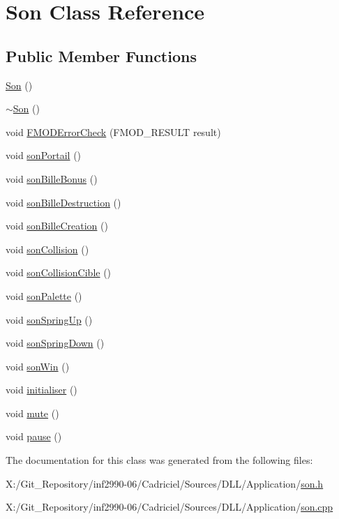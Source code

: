 \hypertarget{class_son}{\section{Son Class Reference}
\label{class_son}
}
\subsection*{Public Member Functions}
\begin{DoxyCompactItemize}
\item 
\hyperlink{group__inf2990_ga20959ed8377de4ceaaa835fb5092cc73}{Son} ()
\item 
\hyperlink{group__inf2990_gab5bc2f6252e48b6ace6948cb730c6e3e}{$\sim$\-Son} ()
\item 
void \hyperlink{group__inf2990_ga9f42aa8fe9666fdb9845d69a32652265}{F\-M\-O\-D\-Error\-Check} (F\-M\-O\-D\-\_\-\-R\-E\-S\-U\-L\-T result)
\item 
void \hyperlink{group__inf2990_gaa31e5f371d2cec4cd3e2c0411aa59d79}{son\-Portail} ()
\item 
void \hyperlink{group__inf2990_gad0ac66ec1e71ffbb7186add122bea57a}{son\-Bille\-Bonus} ()
\item 
void \hyperlink{group__inf2990_ga97e186097aa2bd7cdbac51aa1d89ab1f}{son\-Bille\-Destruction} ()
\item 
void \hyperlink{group__inf2990_gab09a0d564829d69afa9977ef99f6e535}{son\-Bille\-Creation} ()
\item 
void \hyperlink{group__inf2990_gabe3e586fa674225f5e64127e1d8b2055}{son\-Collision} ()
\item 
void \hyperlink{group__inf2990_ga5f20e47f734648fbdab90e0a92d287ec}{son\-Collision\-Cible} ()
\item 
void \hyperlink{group__inf2990_ga9fb0c05f5b418ee4f7323afa4b457fc1}{son\-Palette} ()
\item 
void \hyperlink{group__inf2990_ga1f55bd88de2262d9ccc5d935b164dd5b}{son\-Spring\-Up} ()
\item 
void \hyperlink{group__inf2990_ga9d214316708dd0bff275dc4460c25e55}{son\-Spring\-Down} ()
\item 
void \hyperlink{group__inf2990_gaf954de0e79ea1b3f49d890d73eca3fb3}{son\-Win} ()
\item 
void \hyperlink{group__inf2990_gab6526055445eaaac047947ece198aa0b}{initialiser} ()
\item 
void \hyperlink{group__inf2990_gab95cfc4ddc9a3eb503af37b99ef32aeb}{mute} ()
\item 
void \hyperlink{group__inf2990_ga55f475d6aacb850b08cc6802b8616350}{pause} ()
\end{DoxyCompactItemize}


The documentation for this class was generated from the following files\-:\begin{DoxyCompactItemize}
\item 
X\-:/\-Git\-\_\-\-Repository/inf2990-\/06/\-Cadriciel/\-Sources/\-D\-L\-L/\-Application/\hyperlink{son_8h}{son.\-h}\item 
X\-:/\-Git\-\_\-\-Repository/inf2990-\/06/\-Cadriciel/\-Sources/\-D\-L\-L/\-Application/\hyperlink{son_8cpp}{son.\-cpp}\end{DoxyCompactItemize}
